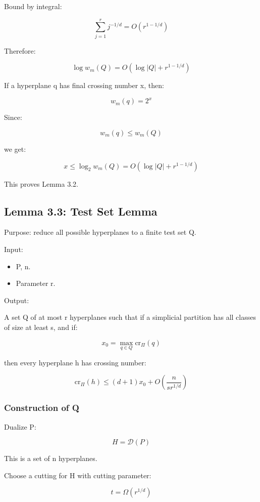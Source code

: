 \documentclass[
  11pt,
]{article}
\providecommand{\tightlist}{%
  \setlength{\itemsep}{0pt}\setlength{\parskip}{0pt}}
\begin{document}
Bound by integral:

\[
\sum_{j=1}^{r}j^{-1/d} = O(r^{1-1/d})
\]

Therefore:

\[
\log w_m(Q) = O(\log |Q|+r^{1-1/d})
\]

If a hyperplane q has final crossing number x, then:

\[
w_m(q)=2^x
\]

Since:

\[
w_m(q)\le w_m(Q)
\]

we get:

\[
x\le \log_2 w_m(Q) = O(\log |Q|+r^{1-1/d})
\]

This proves Lemma 3.2.

\hypertarget{lemma-3.3-test-set-lemma}{%
\subsection{Lemma 3.3: Test Set Lemma}\label{lemma-3.3-test-set-lemma}}

Purpose: reduce all possible hyperplanes to a finite test set Q.

Input:

\begin{itemize}
\tightlist
\item
  P, n.
\item
  Parameter r.
\end{itemize}

Output:

A set Q of at most r hyperplanes such that if a simplicial partition has
all classes of size at least s, and if:

\[
x_0=\max_{q\in Q}\mathrm{cr}_\Pi(q)
\]

then every hyperplane h has crossing number:

\[
\mathrm{cr}_\Pi(h) \le (d+1)x_0 + O\left(\frac{n}{s r^{1/d}}\right)
\]

\hypertarget{construction-of-q}{%
\subsubsection{Construction of Q}\label{construction-of-q}}

Dualize P:

\[
H=\mathcal{D}(P)
\]

This is a set of n hyperplanes.

Choose a cutting for H with cutting parameter:

\[
t=\Omega(r^{1/d})
\]
\end{document}
